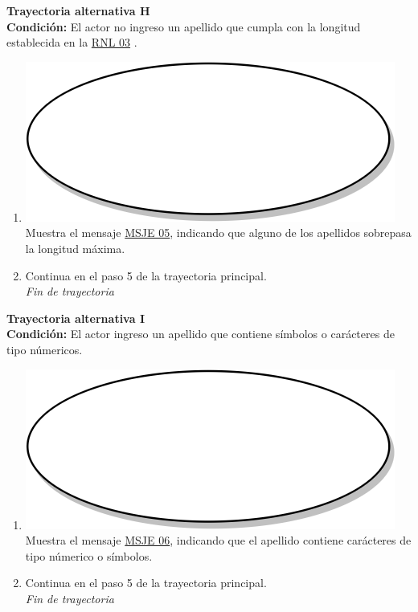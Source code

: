 \textbf{Trayectoria alternativa H} \label{cu2_ta_h}\\
\textbf{Condición:} El actor no ingreso un apellido que cumpla con la longitud establecida en la \hyperref[rnl_03]{RNL 03} .\\
 \begin{enumerate}[label=H\arabic*]
    \item {\includegraphics[scale=.05]{Capitulo3/img/proceso.png} Muestra el mensaje \hyperref[msje_05]{MSJE 05}, indicando que alguno de los apellidos sobrepasa la longitud máxima.}
    \item {Continua en el paso 5 de la trayectoria principal.} \\
    \textit{Fin de trayectoria} \\
\end{enumerate}

\textbf{Trayectoria alternativa I} \label{cu2_ta_i}\\
\textbf{Condición:} El actor ingreso un apellido que contiene símbolos o carácteres de tipo númericos.\\
 \begin{enumerate}[label=I\arabic*]
    \item {\includegraphics[scale=.05]{Capitulo3/img/proceso.png} Muestra el mensaje \hyperref[msje_06]{MSJE 06}, indicando que el apellido contiene carácteres de tipo númerico o símbolos.}
    \item {Continua en el paso 5 de la trayectoria principal.} \\
    \textit{Fin de trayectoria} \\
\end{enumerate}

